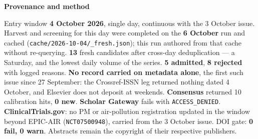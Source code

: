 \documentclass[10pt]{article}
\begin{document}


\vspace{2mm}

\begin{keybox}
{\sffamily\bfseries\footnotesize\color{Deep}Provenance and method}\\[1.2mm]
{\fontsize{7.2}{8.8}\selectfont
Entry window \textbf{4 October 2026}, single day, continuous with the 3 October issue. Harvest
and screening for this day were completed on the \textbf{6 October} run and cached
(\texttt{cache/2026-10-04/\_fresh.json}); this run authored from that cache without re-querying.
\textbf{13} fresh candidates after cross-day deduplication --- a Saturday, and the lowest daily volume of
the series. \textbf{5 admitted}, \textbf{8 rejected} with logged reasons. \textbf{No record carried on
metadata alone}, the first such issue since 27 September: the Crossref-ISSN leg returned nothing dated
4 October, and Elsevier does not deposit at weekends. \textbf{Consensus} returned 10 calibration hits,
\textbf{0 new}. \textbf{Scholar Gateway} fails with \texttt{ACCESS\_DENIED}. \textbf{ClinicalTrials.gov}:
no PM or air-pollution registration updated in the window beyond EPIC-AIR (\texttt{NCT07500948}), carried
from the 3 October issue. DOI gate: \textbf{0 fail, 0 warn}. Abstracts remain the copyright of their
respective publishers.\par}
\end{keybox}
\end{document}
